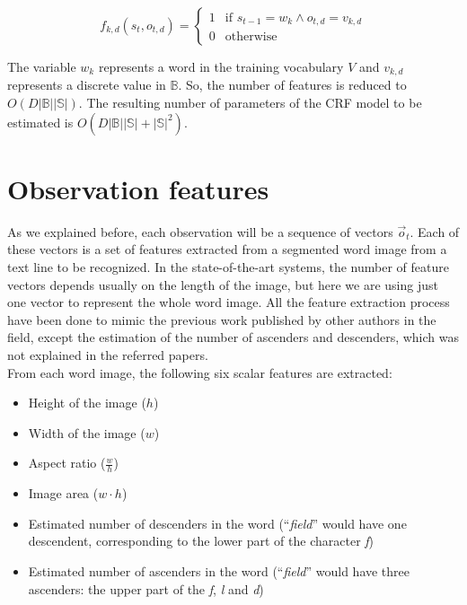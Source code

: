 \documentclass[10pt,a4paper]{article}
\begin{document}
\begin{equation}
f_{k,d}(s_t, o_{t,d}) = \begin{cases}
1 & \text{if } s_{t-1} = w_k \wedge o_{t,d} = v_{k,d} \\
0 & \text{otherwise}
\end{cases}
\end{equation}

The variable $w_k$ represents a word in the training vocabulary $V$ and $v_{k,d}$ represents a discrete value in $\mathbb{B}$. So, the number of features is reduced to $O(D |\mathbb{B}| |\mathbb{S}|)$. The resulting number of parameters of the CRF model to be estimated is $O(D |\mathbb{B}| |\mathbb{S}| + |\mathbb{S}|^2)$.

\section{Observation features}
As we explained before, each observation will be a sequence of vectors $\vec{o}_t$. Each of these vectors is a set of features extracted from a segmented word image from a text line to be recognized. In the state-of-the-art systems, the number of feature vectors depends usually on the length of the image, but here we are using just one vector to represent the whole word image. All the feature extraction process have been done to mimic the previous work published by other authors in the field\cite{feng2006exploring,lavrenko2004holistic}, except the estimation of the number of ascenders and descenders, which was not explained in the referred papers.\\

From each word image, the following six scalar features are extracted:\\
\begin{itemize}
\item Height of the image ($h$)
\item Width of the image ($w$)
\item Aspect ratio ($\frac{w}{h}$)
\item Image area ($w \cdot h$)
\item Estimated number of descenders in the word (``\emph{field}'' would have one descendent, corresponding to the lower part of the character \emph{f})
\item Estimated number of ascenders in the word (``\emph{field}'' would have three ascenders: the upper part of the \emph{f}, \emph{l} and \emph{d})
\end{itemize}
\end{document}
